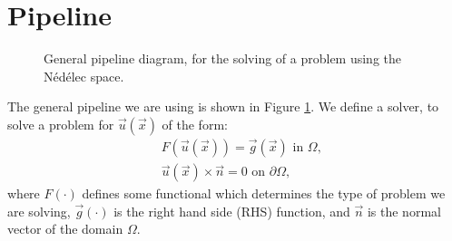 \section{Pipeline}
\begin{figure}[!h]
    \centering
    
    \caption{General pipeline diagram, for the solving of a problem using the Nédélec space.}
    \label{fig:gen_diag}
\end{figure}
The general pipeline we are using is shown in Figure \ref{fig:gen_diag}. We define a solver, to solve a problem for $\vec{u}(\vec{x})$ of the form:
\begin{align}
    &F(\vec{u}(\vec{x})) = \vec{g}(\vec{x}) \text{ in } \Omega\text{,} \\
    &\vec{u}(\vec{x}) \times \vec{n} = 0 \text{ on } \partial \Omega \text{,}
\end{align}
where $F(\cdot)$ defines some functional which determines the type of problem we are solving, $\vec{g}(\cdot)$ is the right hand side (RHS) function, and $\vec{n}$ is the normal vector of the domain $\Omega$.\medskip

